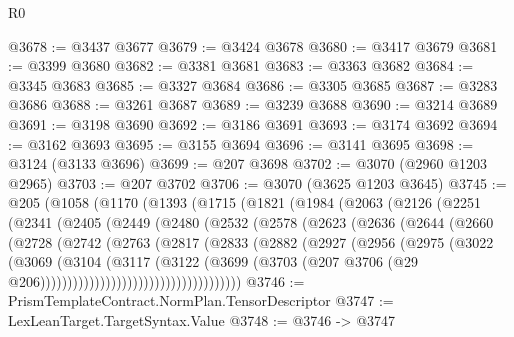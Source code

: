 \begin{lexlean}{R0}
\begin{coremodule}
@3678 := @3437 @3677
@3679 := @3424 @3678
@3680 := @3417 @3679
@3681 := @3399 @3680
@3682 := @3381 @3681
@3683 := @3363 @3682
@3684 := @3345 @3683
@3685 := @3327 @3684
@3686 := @3305 @3685
@3687 := @3283 @3686
@3688 := @3261 @3687
@3689 := @3239 @3688
@3690 := @3214 @3689
@3691 := @3198 @3690
@3692 := @3186 @3691
@3693 := @3174 @3692
@3694 := @3162 @3693
@3695 := @3155 @3694
@3696 := @3141 @3695
@3698 := @3124 (@3133 @3696)
@3699 := @207 @3698
@3702 := @3070 (@2960 @1203 @2965)
@3703 := @207 @3702
@3706 := @3070 (@3625 @1203 @3645)
@3745 := @205
    (@1058
      (@1170
        (@1393
          (@1715
            (@1821
              (@1984
                (@2063
                  (@2126
                    (@2251
                      (@2341
                        (@2405
                          (@2449
                            (@2480
                              (@2532
                                (@2578
                                  (@2623
                                    (@2636
                                      (@2644
                                        (@2660
                                          (@2728
                                            (@2742
                                              (@2763
                                                (@2817
                                                  (@2833
                                                    (@2882
                                                      (@2927
                                                        (@2956
                                                          (@2975
                                                            (@3022
                                                              (@3069
                                                                (@3104
                                                                  (@3117
                                                                    (@3122
                                                                      (@3699
                                                                        (@3703
                                                                          (@207
                                                                            @3706
                                                                            (@29
                                                                              @206)))))))))))))))))))))))))))))))))))))
@3746 := PrismTemplateContract.NormPlan.TensorDescriptor
@3747 := LexLeanTarget.TargetSyntax.Value
@3748 := @3746 -> @3747

\end{coremodule}
\end{lexlean}
